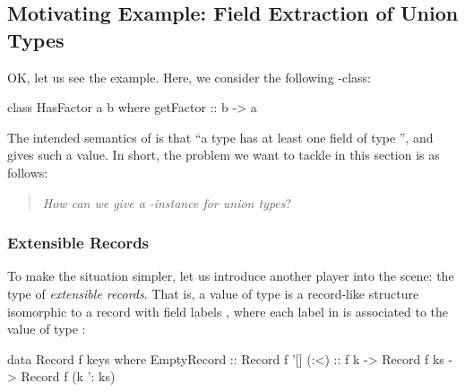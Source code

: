 \documentclass[demotion-paper.tex]{subfiles}
\begin{document}
\subsection{Motivating Example: Field Extraction of Union Types}
OK, let us see the example.
Here, we consider the following -class:

\begin{code}
class HasFactor a b where
  getFactor :: b -> a
\end{code}

The intended semantics of  is that ``a type  has at least one field of type '', and  gives such a value.
In short, the problem we want to tackle in this section is as follows:
\begin{quote}
  \emph{How can we give a} \emph{-instance for union types}?
\end{quote}

\subsubsection{Extensible Records}
To make the situation simpler, let us introduce another player into the scene: the type  of \emph{extensible records}.
That is, a value of type  is a record-like structure isomorphic to a record with field labels , where each label  in  is associated to the value of type :

\begin{code}
data Record f keys where
  EmptyRecord :: Record f '[]
  (:<) :: f k -> Record f ks -> Record f (k ': ks)
\end{code}
\end{document}
